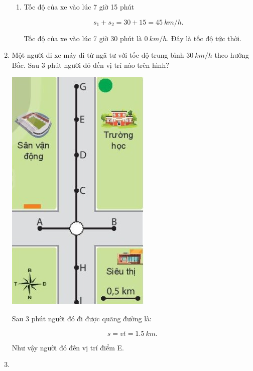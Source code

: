 \begin{enumerate}[label=\bfseries Câu \arabic*:]
{\begin{enumerate}[label=\alph*)]
			$$v_\text{tb} = \dfrac{s}{t} = \dfrac{15}{\text{0,5}} = \SI{30}{km/h}.$$
			
			\item Tốc độ của xe vào lúc 7 giờ 15 phút 
			
			$$s_1 +s_2 = 30 + 15 = \SI{45}{km/h}.$$
			
			Tốc độ của xe vào lúc 7 giờ 30 phút là $\SI{0}{km/h}$. Đây là tốc độ tức thời.
			
			
		\end{enumerate}
	}
		\item {}
	
	
	{
	Một người đi xe máy đi từ ngã tư với tốc độ trung bình $\SI{30}{km/h}$ theo hướng Bắc. Sau 3 phút người đó đến vị trí nào trên hình?
	\begin{center}
		\includegraphics[scale=1]{../figs/VN10-2022-PH-TP005-1.jpg}
	\end{center}
	}
	\hideall
	{
		Sau 3 phút người đó đi được quãng đường là:
		
		$$s = vt = \SI{1,5}{km}.$$ 
		 
		Như vậy người đó đến vị trí điểm E.
	}
		\item {}
	

\end{enumerate}
